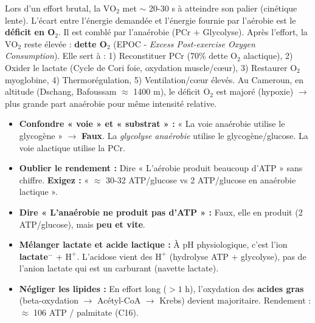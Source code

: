 \documentclass[11pt]{article}
\begin{document}
\begin{savaistu}
Lors d'un effort brutal, la $\text{VO}_2$ met $\sim$ 20-30 s à atteindre son palier (cinétique lente). L'écart entre l'énergie demandée et l'énergie fournie par l'aérobie est le \textbf{déficit en O$_2$}. Il est comblé par l'anaérobie (PCr + Glycolyse). Après l'effort, la $\text{VO}_2$ reste élevée : \textbf{dette O$_2$} (EPOC - \emph{Excess Post-exercise Oxygen Consumption}). Elle sert à : 1) Reconstituer PCr (70\% dette O$_2$ alactique), 2) Oxider le lactate (Cycle de Cori foie, oxydation muscle/cœur), 3) Restaurer $\text{O}_2$ myoglobine, 4) Thermorégulation, 5) Ventilation/cœur élevés. Au Cameroun, en altitude (Dschang, Bafoussam $\approx$ 1400 m), le déficit O$_2$ est majoré (hypoxie) $\rightarrow$ plus grande part anaérobie pour même intensité relative.
\end{savaistu}

\begin{attention}
\begin{itemize}
    \item \textbf{Confondre « voie » et « substrat » :} « La voie anaérobie utilise le glycogène » $\rightarrow$ \textbf{Faux}. La \emph{glycolyse anaérobie} utilise le glycogène/glucose. La voie alactique utilise la PCr.
    \item \textbf{Oublier le rendement :} Dire « L'aérobie produit beaucoup d'ATP » sans chiffre. \textbf{Exigez :} « $\approx$ 30-32 ATP/glucose vs 2 ATP/glucose en anaérobie lactique ».
    \item \textbf{Dire « L'anaérobie ne produit pas d'ATP » :} Faux, elle en produit (2 ATP/glucose), mais \textbf{peu et vite}.
    \item \textbf{Mélanger lactate et acide lactique :} À pH physiologique, c'est l'ion \textbf{lactate}$^-$ + $\text{H}^+$. L'acidose vient des $\text{H}^+$ (hydrolyse ATP + glycolyse), pas de l'anion lactate qui est un carburant (navette lactate).
    \item \textbf{Négliger les lipides :} En effort long ($> 1$ h), l'oxydation des \textbf{acides gras} (beta-oxydation $\rightarrow$ Acétyl-CoA $\rightarrow$ Krebs) devient majoritaire. Rendement : $\approx$ 106 ATP / palmitate (C16).
\end{itemize}
\end{attention}
\end{document}
